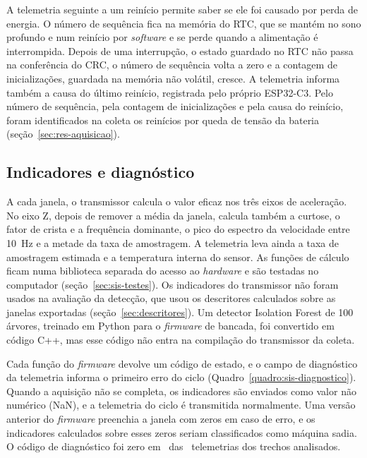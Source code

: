 A telemetria seguinte a um reinício permite saber se ele foi causado por perda de energia. O número de sequência fica na memória do RTC, que se mantém no sono profundo e num reinício por \textit{software} e se perde quando a alimentação é interrompida. Depois de uma interrupção, o estado guardado no RTC não passa na conferência do CRC, o número de sequência volta a zero e a contagem de inicializações, guardada na memória não volátil, cresce. A telemetria informa também a causa do último reinício, registrada pelo próprio ESP32-C3. Pelo número de sequência, pela contagem de inicializações e pela causa do reinício, foram identificados na coleta os reinícios por queda de tensão da bateria (seção~\ref{sec:res-aquisicao}).

\subsection{Indicadores e diagnóstico}

A cada janela, o transmissor calcula o valor eficaz nos três eixos de aceleração. No eixo Z, depois de remover a média da janela, calcula também a curtose, o fator de crista e a frequência dominante, o pico do espectro da velocidade entre \SI{10}{\hertz} e a metade da taxa de amostragem. A telemetria leva ainda a taxa de amostragem estimada e a temperatura interna do sensor. As funções de cálculo ficam numa biblioteca separada do acesso ao \textit{hardware} e são testadas no computador (seção~\ref{sec:sis-testes}). Os indicadores do transmissor não foram usados na avaliação da detecção, que usou os descritores calculados sobre as janelas exportadas (seção~\ref{sec:descritores}). Um detector Isolation Forest de \num{100} árvores, treinado em Python para o \textit{firmware} de bancada, foi convertido em código C++, mas esse código não entra na compilação do transmissor da coleta.

Cada função do \textit{firmware} devolve um código de estado, e o campo de diagnóstico da telemetria informa o primeiro erro do ciclo (Quadro~\ref{quadro:sis-diagnostico}). Quando a aquisição não se completa, os indicadores são enviados como valor não numérico (NaN), e a telemetria do ciclo é transmitida normalmente. Uma versão anterior do \textit{firmware} preenchia a janela com zeros em caso de erro, e os indicadores calculados sobre esses zeros seriam classificados como máquina sadia. O código de diagnóstico foi zero em \sisCampoDiagZero\ das \sisCampoTelemetrias\ telemetrias dos trechos analisados.

